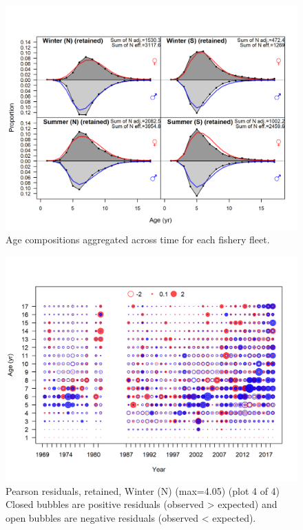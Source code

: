 \documentclass[12pt,]{article}
\begin{document}
\begin{figure}
\centering
\includegraphics{r4ss/plots_mod1/comp_agefit__aggregated_across_time.png}
\caption{Age compositions aggregated across time for each fishery fleet.
\label{fig:age_agg}}
\end{figure}

\FloatBarrier

\begin{figure}
\centering
\includegraphics{r4ss/plots_mod1/comp_agefit_residsflt1mkt2_page4.png}
\caption{Pearson residuals, retained, Winter (N) (max=4.05) (plot 4 of
4)\\
Closed bubbles are positive residuals (observed \textgreater{} expected)
and open bubbles are negative residuals (observed \textless{} expected).
\label{fig:wn_age_pearson}}
\end{figure}
\end{document}

